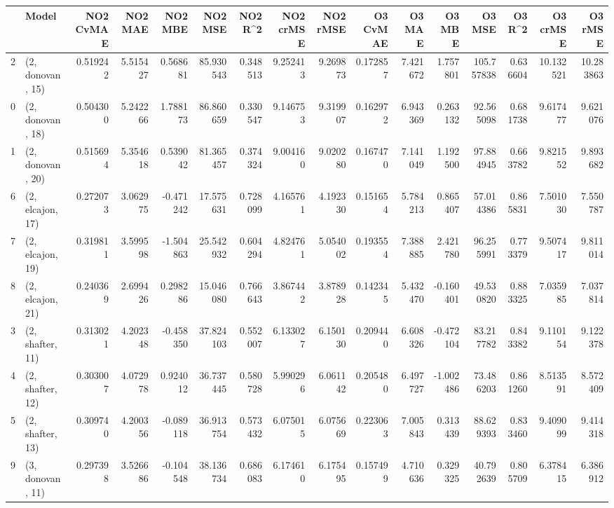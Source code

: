 \begin{tabular}{llrrrrrrrrrrrrrr}
\toprule
{} &             Model &  NO2 CvMAE &   NO2 MAE &   NO2 MBE &    NO2 MSE &   NO2 R\textasciicircum2 &  NO2 crMSE &  NO2 rMSE &  O3 CvMAE &    O3 MAE &    O3 MBE &      O3 MSE &    O3 R\textasciicircum2 &   O3 crMSE &    O3 rMSE \\
\midrule
2  &  (2, donovan, 15) &   0.519242 &  5.515427 &  0.568681 &  85.930543 &  0.348513 &   9.252413 &  9.269873 &  0.172857 &  7.421672 &  1.757801 &  105.757838 &  0.636604 &  10.132521 &  10.283863 \\
0  &  (2, donovan, 18) &   0.504300 &  5.242266 &  1.788173 &  86.860659 &  0.330547 &   9.146753 &  9.319907 &  0.162972 &  6.943369 &  0.263132 &   92.565098 &  0.681738 &   9.617477 &   9.621076 \\
1  &  (2, donovan, 20) &   0.515694 &  5.354618 &  0.539042 &  81.365457 &  0.374324 &   9.004160 &  9.020280 &  0.167470 &  7.141049 &  1.192500 &   97.884945 &  0.663782 &   9.821552 &   9.893682 \\
6  &  (2, elcajon, 17) &   0.272073 &  3.062975 & -0.471242 &  17.575631 &  0.728099 &   4.165761 &  4.192330 &  0.151654 &  5.784213 &  0.865407 &   57.014386 &  0.865831 &   7.501030 &   7.550787 \\
7  &  (2, elcajon, 19) &   0.319811 &  3.599598 & -1.504863 &  25.542932 &  0.604294 &   4.824761 &  5.054002 &  0.193554 &  7.388885 &  2.421780 &   96.255991 &  0.773379 &   9.507417 &   9.811014 \\
8  &  (2, elcajon, 21) &   0.240369 &  2.699426 &  0.298286 &  15.046080 &  0.766643 &   3.867442 &  3.878928 &  0.142345 &  5.432470 & -0.160401 &   49.530820 &  0.883325 &   7.035985 &   7.037814 \\
3  &  (2, shafter, 11) &   0.313021 &  4.202348 & -0.458350 &  37.824103 &  0.552007 &   6.133027 &  6.150130 &  0.209440 &  6.608326 & -0.472104 &   83.217782 &  0.843382 &   9.110154 &   9.122378 \\
4  &  (2, shafter, 12) &   0.303007 &  4.072978 &  0.924012 &  36.737445 &  0.580728 &   5.990296 &  6.061142 &  0.205480 &  6.497727 & -1.002486 &   73.486203 &  0.861260 &   8.513591 &   8.572409 \\
5  &  (2, shafter, 13) &   0.309740 &  4.200356 & -0.089118 &  36.913754 &  0.573432 &   6.075015 &  6.075669 &  0.223063 &  7.005843 &  0.313439 &   88.629393 &  0.833460 &   9.409099 &   9.414318 \\
9  &  (3, donovan, 11) &   0.297398 &  3.526686 & -0.104548 &  38.136734 &  0.686083 &   6.174610 &  6.175495 &  0.157499 &  4.710636 &  0.329325 &   40.792639 &  0.805709 &   6.378415 &   6.386912 \\

\end{tabular}
